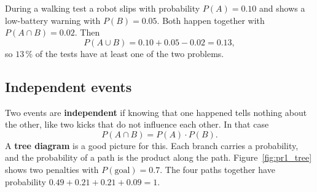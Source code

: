 \begin{center}
\label{fig:pr1_venn}
\end{center}

\begin{example}
During a walking test a robot slips with probability $P(A)=0.10$ and shows a low-battery warning with $P(B)=0.05$. Both happen together with $P(A\cap B)=0.02$. Then
\[
P(A\cup B)=0.10+0.05-0.02=0.13,
\]
so $13\,\%$ of the tests have at least one of the two problems.
\end{example}

\subsection*{Independent events}
Two events are \textbf{independent} if knowing that one happened tells nothing about the other, like two kicks that do not influence each other. In that case
\[
P(A\cap B)=P(A)\cdot P(B).
\]
A \textbf{tree diagram} is a good picture for this. Each branch carries a probability, and the probability of a path is the product along the path. Figure~\ref{fig:pr1_tree} shows two penalties with $P(\text{goal})=0.7$. The four paths together have probability $0.49+0.21+0.21+0.09=1$.

